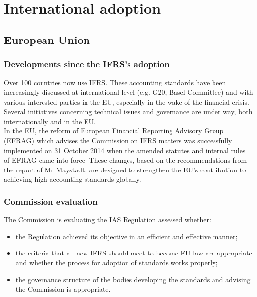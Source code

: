 \section{International adoption}
\label{sec:Adoption}

\subsection{European Union}

\subsubsection{Developments since the IFRS's adoption}
Over 100 countries now use IFRS. These accounting standards have been increasingly discussed at international level (e.g. G20, Basel Committee) and with various interested parties in the EU, especially in the wake of the financial crisis. \\

Several initiatives concerning technical issues and governance are under way, both internationally and in the EU. \\

In the EU, the reform of European Financial Reporting Advisory Group (EFRAG) which advises the Commission on IFRS matters was successfully implemented on 31 October 2014 when the amended statutes and internal rules of EFRAG came into force. These changes, based on the recommendations from the report of Mr Maystadt, are designed to strengthen the EU’s contribution to achieving high accounting standards globally. 


\subsubsection{Commission evaluation}
The Commission is evaluating the IAS Regulation assessed whether:
\begin{itemize}
	\item the Regulation achieved its objective in an efficient and effective manner;
	\item the criteria that all new IFRS should meet to become EU law are appropriate and whether the process for adoption of standards works properly;
	\item the governance structure of the bodies developing the standards and advising the Commission is appropriate.
\end{itemize}

